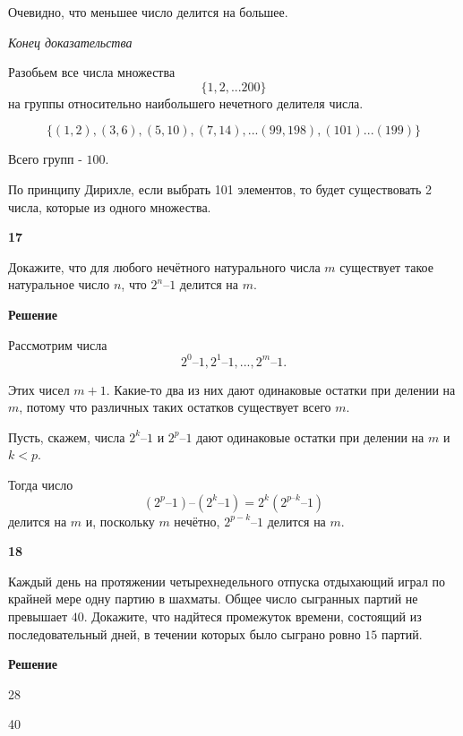 \documentclass{article}
\begin{document}
Очевидно, что меньшее число делится на большее.

\textit{Конец доказательства}

Разобьем все числа множества $$\{1, 2, ... 200\}$$  на группы относительно наибольшего нечетного делителя числа. 

$$\{ (1, 2), (3, 6), (5, 10), (7, 14), ...(99, 198),  (101) ... (199) \}$$

Всего групп -  $100$.

По принципу Дирихле, если выбрать 101 элементов, то будет существовать 2 числа, которые из одного множества. 
 
\newpage

\textbf{17}

Докажите, что для любого нечётного натурального числа  $m$ существует такое натуральное число $n$, что  $2^n – 1$  делится на $m$.

\textbf{Решение}

Рассмотрим числа  $$2^0 – 1,  2^1 – 1,  ...,  2^m – 1.$$

Этих чисел  $m + 1$.  Какие-то два из них дают одинаковые остатки при делении на $m$, потому что различных таких остатков существует всего $m$. 

Пусть, скажем, числа  $2^k – 1$  и  $2^p – 1$  дают одинаковые остатки при делении на $m$ и  $k < p$.  

Тогда число  $$(2^p – 1) – (2^k – 1) = 2^k(2^{p–k} – 1)$$  делится на $m$ и, поскольку $m$ нечётно,  $2^{p - k} – 1$  делится на $m$.


\newpage

\textbf{18}

Каждый день на протяжении четырехнедельного отпуска отдыхающий играл по крайней мере одну партию в шахматы. Общее число сыгранных партий не превышает $40$. Докажите, что надйтеся промежуток времени, состоящий из последовательный дней, в течении которых было сыграно ровно  $15 $ партий. 

\textbf{Решение}


28 

40 
\end{document}
